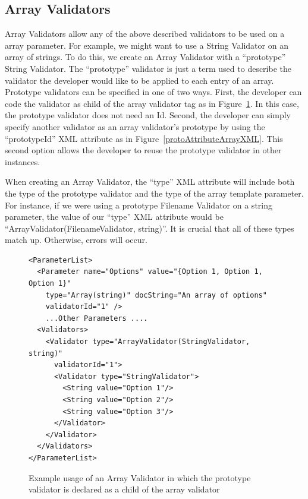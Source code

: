 \subsection{Array Validators}
Array Validators allow any of the above described validators to be used on a array parameter. For example, we might want to use a
String Validator on an array of strings. To do this, we create an Array Validator with a ``prototype'' String Validator. The 
``prototype'' validator is just a term used to describe the validator the developer would like to be applied to each entry of an
array. Prototype validators can be specified in one of two ways. First, the developer can code the validator as child of the array validator
tag as in Figure~\ref{actualArrayValidatorXML}. In this case, the prototype validator does not need an Id. 
Second, the developer can simply specify another validator as an array validator's prototype by using the
``prototypeId'' XML attribute as in Figure~\ref{protoAttributeArrayXML}. This second option allows the developer to reuse the prototype validator in 
other instances.

When creating an Array Validator, the ``type'' XML attribute will include both the type of the prototype validator and the type of the array
template parameter. For instance, if we were using a prototype Filename Validator on a string parameter, the value of our ``type'' XML attribute would
be ``ArrayValidator(FilenameValidator, string)''. It is crucial that all of these types match up. Otherwise, errors will occur.

\begin{figure}
\centering
{\footnotesize
\begin{Verbatim}
<ParameterList>
  <Parameter name="Options" value="{Option 1, Option 1, Option 1}" 
    type="Array(string)" docString="An array of options" 
    validatorId="1" />
    ...Other Parameters ....
  <Validators>
    <Validator type="ArrayValidator(StringValidator, string)" 
      validatorId="1">
      <Validator type="StringValidator">
        <String value="Option 1"/>
        <String value="Option 2"/>
        <String value="Option 3"/>
      </Validator>
    </Validator>
  </Validators>
</ParameterList>
\end{Verbatim}
}
\caption{Example usage of an Array Validator in which the prototype validator is declared as a child of the array validator}
\label{actualArrayValidatorXML}
\end{figure}


